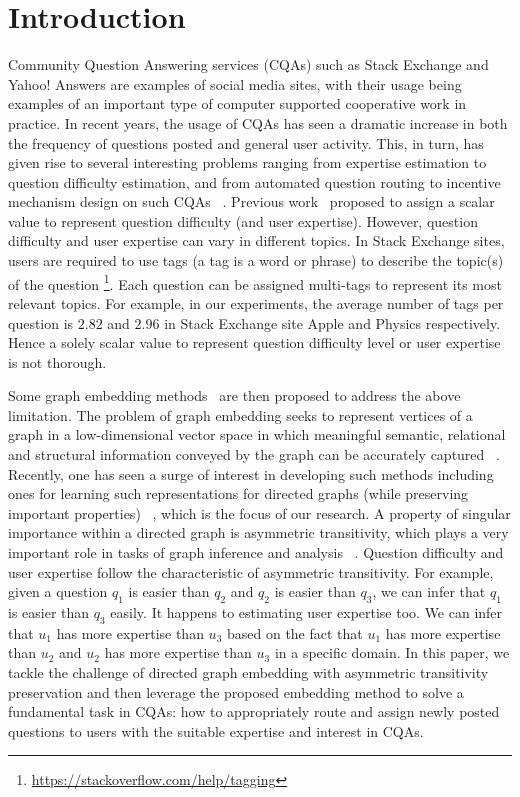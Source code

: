 \documentclass[letterpaper]{article} \usepackage{aaai19}  \usepackage{times}  \usepackage{helvet}  \usepackage{courier}  \usepackage{url}  \usepackage{graphicx}  \usepackage{booktabs} \usepackage{xcolor}
\begin{document}
\section{Introduction}
\label{sec:introduction}

Community Question Answering services (CQAs) such as Stack Exchange and Yahoo! Answers are examples of social media sites, with their usage being examples of an important type of computer supported cooperative work in practice. In recent years, the usage of CQAs
has seen a dramatic increase in both the frequency of questions posted and general user activity.
This, in turn, has given rise to several interesting problems ranging from expertise estimation to question difficulty estimation, and from automated question routing to incentive mechanism design on such CQAs ~\cite{Fang2016QuestionAnswering,QDEE2018}. Previous work~\cite{wang2014,QDEE2018} proposed to assign a scalar value to represent question difficulty (and user expertise). However, question difficulty and user expertise can vary in different topics. In Stack Exchange sites, users are required to use tags (a tag is a word or phrase) to describe the topic(s) of the question \footnote{\url{https://stackoverflow.com/help/tagging}}. Each question can be assigned multi-tags to represent its most relevant topics. For example, in our experiments, the average number of tags per question is $2.82$ and $2.96$ in Stack Exchange site Apple and Physics respectively. Hence a solely scalar value to represent question difficulty level or user expertise is not thorough.

Some graph embedding methods~\cite{Fang2016QuestionAnswering,zhaoexpert2016,zhao2017community} are then proposed to address the above limitation. 
The problem of graph embedding seeks to represent vertices of a graph in a low-dimensional vector space in which meaningful semantic, relational and structural information conveyed by the graph can be accurately captured ~\cite{Ma2018WSDM}. Recently, one has seen a surge of interest in developing such methods including ones for learning such representations for directed graphs (while preserving important properties) ~\cite{Ou2016KDDAsymmetric}, which is the focus of our research. A property of singular importance within a directed graph is asymmetric transitivity, which plays a very important role in tasks of graph inference and analysis ~\cite{Ou2016KDDAsymmetric}. Question difficulty and user expertise follow the characteristic of asymmetric transitivity. For example, given a question $q_1$ is easier than $q_2$ and $q_2$ is easier than $q_3$, we can infer that $q_1$ is easier than $q_3$ easily. It happens to estimating user expertise too. We can infer that $u_1$ has more expertise than $u_3$ based on the fact that $u_1$ has more expertise than $u_2$ and $u_2$ has more expertise than $u_3$ in a specific domain. In this paper, we tackle the challenge of directed graph embedding with asymmetric transitivity preservation and then leverage the proposed embedding method to solve a fundamental task in CQAs: how to appropriately route and assign newly posted questions to users with the suitable expertise and interest in CQAs. 
\end{document}
